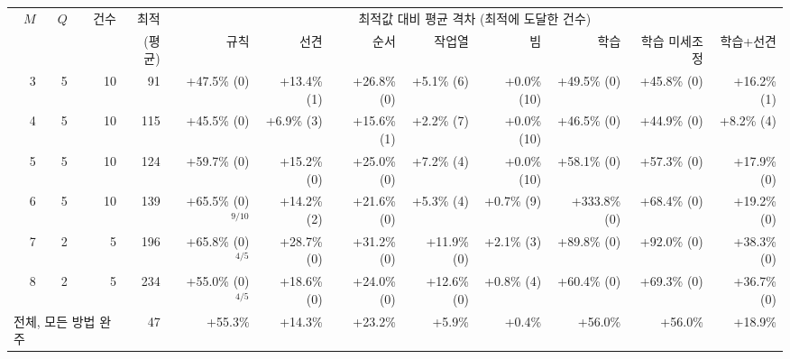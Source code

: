 \begin{tabular}{rrrrrrrrrrrr}
\toprule
$M$ & $Q$ & 건수 & 최적 & \multicolumn{8}{c}{최적값 대비 평균 격차 (최적에 도달한 건수)} \\
\cmidrule(lr){5-12}
& & & (평균) & 규칙 & 선견 & 순서 & 작업열 & 빔 & 학습 & 학습 미세조정 & 학습+선견 \\
\midrule
3 & 5 & 10 & 91 & +47.5\% (0) & +13.4\% (1) & +26.8\% (0) & +5.1\% (6) & +0.0\% (10) & +49.5\% (0) & +45.8\% (0) & +16.2\% (1) \\
4 & 5 & 10 & 115 & +45.5\% (0) & +6.9\% (3) & +15.6\% (1) & +2.2\% (7) & +0.0\% (10) & +46.5\% (0) & +44.9\% (0) & +8.2\% (4) \\
5 & 5 & 10 & 124 & +59.7\% (0) & +15.2\% (0) & +25.0\% (0) & +7.2\% (4) & +0.0\% (10) & +58.1\% (0) & +57.3\% (0) & +17.9\% (0) \\
6 & 5 & 10 & 139 & +65.5\% (0)$^{9/10}$ & +14.2\% (2) & +21.6\% (0) & +5.3\% (4) & +0.7\% (9) & +333.8\% (0) & +68.4\% (0) & +19.2\% (0) \\
7 & 2 & 5 & 196 & +65.8\% (0)$^{4/5}$ & +28.7\% (0) & +31.2\% (0) & +11.9\% (0) & +2.1\% (3) & +89.8\% (0) & +92.0\% (0) & +38.3\% (0) \\
8 & 2 & 5 & 234 & +55.0\% (0)$^{4/5}$ & +18.6\% (0) & +24.0\% (0) & +12.6\% (0) & +0.8\% (4) & +60.4\% (0) & +69.3\% (0) & +36.7\% (0) \\
\midrule
\multicolumn{3}{l}{전체, 모든 방법 완주} & 47 & +55.3\% & +14.3\% & +23.2\% & +5.9\% & +0.4\% & +56.0\% & +56.0\% & +18.9\% \\
\bottomrule
\end{tabular}%
